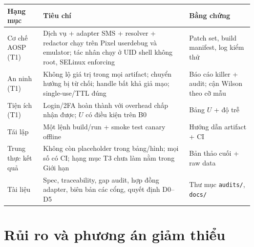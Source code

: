 \documentclass[11pt,a4paper]{article}
\newcommand{\code}[1]{\texttt{\small #1}}
\begin{document}
\begin{longtable}{@{}p{3.6cm}p{7.4cm}p{4.0cm}@{}}
\toprule
\textbf{Hạng mục} & \textbf{Tiêu chí} & \textbf{Bằng chứng} \\
\midrule
\endhead
Cơ chế AOSP (T1) & Dịch vụ + adapter SMS + resolver + redactor chạy trên Pixel userdebug và emulator; tác nhân chạy ở UID shell không root, SELinux enforcing & Patch set, build manifest,
log kiểm thử \\
An ninh (T1) & Không lộ giá trị trong mọi artifact; chuyển hướng bị từ chối; handle bất khả giả mạo; single-use/TTL
đúng & Báo cáo killer + audit; cận Wilson theo cỡ mẫu \\
Tiện ích (T1) & Login/2FA hoàn thành với overhead chấp nhận được; $U$ có điều kiện trên B0 & Bảng $U$ + độ trễ \\
Tái lập & Một lệnh build/run + smoke test canary offline & Hướng dẫn artifact + CI \\
Trung thực kết quả & Không còn placeholder trong bảng/hình; mọi số có CI; hạng mục T3 chưa làm nằm trong Giới hạn & Bản thảo cuối + raw data \\
Tài liệu & Spec, traceability, gap audit, hợp đồng adapter, biên bản các cổng, quyết định D0--D5 & Thư mục \code{audits/}, \code{docs/} \\
\bottomrule
\end{longtable}

\section{Rủi ro và phương án giảm thiểu}
\end{document}
